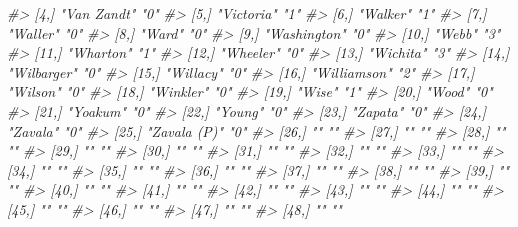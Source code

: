 \documentclass[
  12pt,
  openany]{book}
\newenvironment{Shaded}{\begin{snugshade}}{\end{snugshade}}
\newcommand{\CommentTok}[1]{\textcolor[rgb]{0.37,0.37,0.37}{\textit{#1}}}
\begin{document}
\begin{Shaded}
\begin{Highlighting}[]
\CommentTok{\#\textgreater{}  [4,] "Van Zandt"     "0"  }
\CommentTok{\#\textgreater{}  [5,] "Victoria"      "1"  }
\CommentTok{\#\textgreater{}  [6,] "Walker"        "1"  }
\CommentTok{\#\textgreater{}  [7,] "Waller"        "0"  }
\CommentTok{\#\textgreater{}  [8,] "Ward"          "0"  }
\CommentTok{\#\textgreater{}  [9,] "Washington"    "0"  }
\CommentTok{\#\textgreater{} [10,] "Webb"          "3"  }
\CommentTok{\#\textgreater{} [11,] "Wharton"       "1"  }
\CommentTok{\#\textgreater{} [12,] "Wheeler"       "0"  }
\CommentTok{\#\textgreater{} [13,] "Wichita"       "3"  }
\CommentTok{\#\textgreater{} [14,] "Wilbarger"     "0"  }
\CommentTok{\#\textgreater{} [15,] "Willacy"       "0"  }
\CommentTok{\#\textgreater{} [16,] "Williamson"    "2"  }
\CommentTok{\#\textgreater{} [17,] "Wilson"        "0"  }
\CommentTok{\#\textgreater{} [18,] "Winkler"       "0"  }
\CommentTok{\#\textgreater{} [19,] "Wise"          "1"  }
\CommentTok{\#\textgreater{} [20,] "Wood"          "0"  }
\CommentTok{\#\textgreater{} [21,] "Yoakum"        "0"  }
\CommentTok{\#\textgreater{} [22,] "Young"         "0"  }
\CommentTok{\#\textgreater{} [23,] "Zapata"        "0"  }
\CommentTok{\#\textgreater{} [24,] "Zavala"        "0"  }
\CommentTok{\#\textgreater{} [25,] "Zavala (P)"    "0"  }
\CommentTok{\#\textgreater{} [26,] ""              ""   }
\CommentTok{\#\textgreater{} [27,] ""              ""   }
\CommentTok{\#\textgreater{} [28,] ""              ""   }
\CommentTok{\#\textgreater{} [29,] ""              ""   }
\CommentTok{\#\textgreater{} [30,] ""              ""   }
\CommentTok{\#\textgreater{} [31,] ""              ""   }
\CommentTok{\#\textgreater{} [32,] ""              ""   }
\CommentTok{\#\textgreater{} [33,] ""              ""   }
\CommentTok{\#\textgreater{} [34,] ""              ""   }
\CommentTok{\#\textgreater{} [35,] ""              ""   }
\CommentTok{\#\textgreater{} [36,] ""              ""   }
\CommentTok{\#\textgreater{} [37,] ""              ""   }
\CommentTok{\#\textgreater{} [38,] ""              ""   }
\CommentTok{\#\textgreater{} [39,] ""              ""   }
\CommentTok{\#\textgreater{} [40,] ""              ""   }
\CommentTok{\#\textgreater{} [41,] ""              ""   }
\CommentTok{\#\textgreater{} [42,] ""              ""   }
\CommentTok{\#\textgreater{} [43,] ""              ""   }
\CommentTok{\#\textgreater{} [44,] ""              ""   }
\CommentTok{\#\textgreater{} [45,] ""              ""   }
\CommentTok{\#\textgreater{} [46,] ""              ""   }
\CommentTok{\#\textgreater{} [47,] ""              ""   }
\CommentTok{\#\textgreater{} [48,] ""              ""   }

\end{Highlighting}
\end{Shaded}
\end{document}
